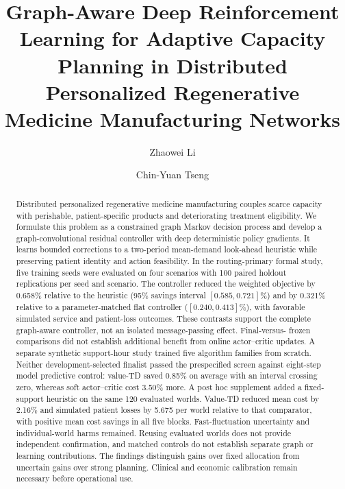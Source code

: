 \documentclass[preprint,review,12pt]{elsarticle}
\begin{document}
\begin{frontmatter}

\title{Graph-Aware Deep Reinforcement Learning for Adaptive Capacity Planning in Distributed Personalized Regenerative Medicine Manufacturing Networks}

\author[inst1]{Zhaowei Li}
\author[inst1]{Chin-Yuan Tseng}

\begin{abstract}

Distributed personalized regenerative medicine manufacturing couples scarce
capacity with perishable, patient-specific products and deteriorating treatment
eligibility. We formulate this problem as a constrained graph Markov decision
process and develop a graph-convolutional residual controller with deep
deterministic policy gradients. It learns bounded corrections to a two-period mean-demand look-ahead
heuristic while preserving patient identity and action feasibility. In the
routing-primary formal study, five training seeds were evaluated on four
scenarios with 100 paired holdout replications per seed and scenario. The
controller reduced the weighted objective by 0.658\% relative to the heuristic
(95\% savings interval $[0.585,0.721]\%$) and by 0.321\% relative to a
parameter-matched flat controller ($[0.240,0.413]\%$), with favorable simulated
service and patient-loss outcomes. These contrasts support the complete
graph-aware controller, not an isolated message-passing effect. Final-versus-
frozen comparisons did not establish additional benefit from online
actor--critic updates. A separate synthetic support-hour study trained five
algorithm families from scratch. Neither development-selected finalist passed
the prespecified screen against eight-step model predictive control: value-TD
saved 0.85\% on average with an interval crossing zero, whereas soft
actor--critic cost 3.50\% more. A post hoc supplement added a fixed-support
heuristic on the same 120 evaluated worlds. Value-TD reduced mean cost by
2.16\% and simulated patient losses by 5.675 per world relative to that
comparator, with positive mean cost savings in all five blocks.
Fast-fluctuation uncertainty and individual-world harms remained. Reusing
evaluated worlds does not provide independent confirmation, and matched
controls do not establish separate graph or learning contributions. The
findings distinguish gains over fixed allocation from uncertain gains over
strong planning. Clinical and economic calibration remain necessary before
operational use.
\end{abstract}


\end{frontmatter}
\end{document}
